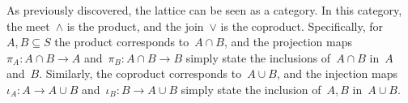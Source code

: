 \begin{figure}[h]
  \begin{center}
  \end{center}
  \caption{\label{fig:prod_coprod_power}}
\end{figure}
As previously discovered, the lattice can be seen as a category.
In this category, the meet~$\wedge$ is the product, and the join~$\vee$ is the coproduct.
Specifically, for~$A,B\subseteq S$ the product corresponds to~$A\cap B$, and the projection maps~$\pi_A\colon A\cap B\to A$ and~$\pi_B\colon A\cap B\to B$ simply state the inclusions of~$A\cap B$ in~$A$ and~$B$.
Similarly, the coproduct corresponds to~$A\cup B$, and the injection maps~$\iota_A\colon A\to A\cup B$ and~$\iota_B\colon B\to A\cup B$ simply state the inclusion of~$A,B$ in~$A\cup B$.

\subsubsection{}

